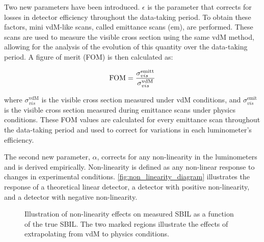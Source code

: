 Two new parameters have been introduced. \(\epsilon\) is the parameter that corrects for losses in detector efficiency throughout the data-taking period. To obtain these factors, mini vdM-like scans, called emittance scans (em), are performed. These scans are used to measure the visible cross section using the same vdM method, allowing for the analysis of the evolution of this quantity over the data-taking period. A figure of merit (FOM) is then calculated as:

\begin{equation}
    \centering
    \text{FOM} = \frac{\sigma^{\text{emitt}}_{vis}}{\sigma^{\text{vdM}}_{vis}}
    \label{eq:figure_of_merit}
\end{equation}

where \(\sigma^{\text{vdM}}_{vis}\) is the visible cross section measured under vdM conditions, and \(\sigma^{\text{emit}}_{vis}\) is the visible cross section measured during emittance scans under physics conditions. These FOM values are calculated for every emittance scan throughout the data-taking period and used to correct for variations in each luminometer's efficiency.

The second new parameter, \(\alpha\), corrects for any non-linearity in the luminometers and is derived empirically. Non-linearity is defined as any non-linear response to changes in experimental conditions. \autoref{fig:non_linearity_diagram} illustrates the response of a theoretical linear detector, a detector with positive non-linearity, and a detector with negative non-linearity.

\begin{figure}[!htb]
    \centering
    \caption[Non-linearity effects on SBIL]{Illustration of non-linearity effects on measured SBIL as a function of the true SBIL. The two marked regions illustrate the effects of extrapolating from vdM to physics conditions.}
    \label{fig:non_linearity_diagram}
\end{figure}

